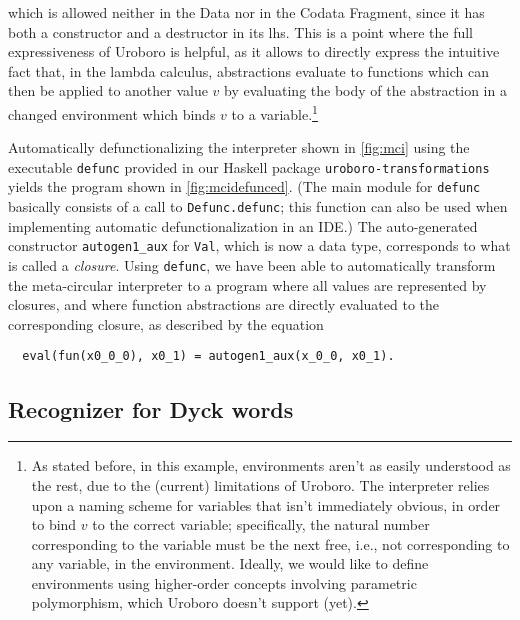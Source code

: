 which is allowed neither in the Data nor in the Codata Fragment, since it has both a constructor and a destructor in its lhs. This is a point where the full expressiveness of Uroboro is helpful, as it allows to directly express the intuitive fact that, in the lambda calculus, abstractions evaluate to functions which can then be applied to another value $v$ by evaluating the body of the abstraction in a changed environment which binds $v$ to a variable.\footnote{As stated before, in this example, environments aren't as easily understood as the rest, due to the (current) limitations of Uroboro. The interpreter relies upon a naming scheme for variables that isn't immediately obvious, in order to bind $v$ to the correct variable; specifically, the natural number corresponding to the variable must be the next free, i.e., not corresponding to any variable, in the environment. Ideally, we would like to define environments using higher-order concepts involving parametric polymorphism, which Uroboro doesn't support (yet).}

Automatically defunctionalizing the interpreter shown in \autoref{fig:mci} using the executable \texttt{defunc} provided in our Haskell package \texttt{uroboro-transformations} yields the program shown in \autoref{fig:mcidefunced}. (The main module for \texttt{defunc} basically consists of a call to \texttt{Defunc.defunc}; this function can also be used when implementing automatic defunctionalization in an IDE.) The auto-generated constructor \texttt{autogen1\_aux} for \texttt{Val}, which is now a data type, corresponds to what is called a \textit{closure}. Using \texttt{defunc}, we have been able to automatically transform the meta-circular interpreter to a program where all values are represented by closures, and where function abstractions are directly evaluated to the corresponding closure, as described by the equation

\begin{lstlisting}
  eval(fun(x0_0_0), x0_1) = autogen1_aux(x_0_0, x0_1).
\end{lstlisting}

\subsection{Recognizer for Dyck words}
\label{ssec:dyck}

